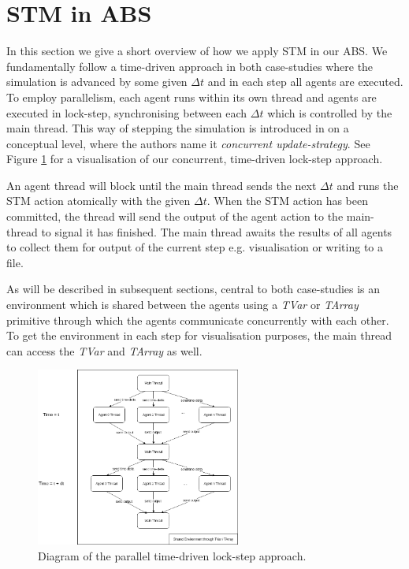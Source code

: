 \section{STM in ABS}
\label{sec:stm_abs}
In this section we give a short overview of how we apply STM in our ABS. We fundamentally follow a time-driven approach in both case-studies where the simulation is advanced by some given $\Delta t$ and in each step all agents are executed. To employ parallelism, each agent runs within its own thread and agents are executed in lock-step, synchronising between each $\Delta t$ which is controlled by the main thread. This way of stepping the simulation is introduced in \cite{thaler_art_2017} on a conceptual level, where the authors name it \textit{concurrent update-strategy}. See Figure \ref{fig:stm_abs_structure} for a visualisation of our concurrent, time-driven lock-step approach. 

An agent thread will block until the main thread sends the next $\Delta t$ and runs the STM action atomically with the given $\Delta t$. When the STM action has been committed, the thread will send the output of the agent action to the main-thread to signal it has finished. The main thread awaits the results of all agents to collect them for output of the current step e.g. visualisation or writing to a file.

As will be described in subsequent sections, central to both case-studies is an environment which is shared between the agents using a \textit{TVar} or \textit{TArray} primitive through which the agents communicate concurrently with each other. To get the environment in each step for visualisation purposes, the main thread can access the \textit{TVar} and \textit{TArray} as well. 

\begin{figure}
	\centering
	\includegraphics[width=0.6\textwidth, angle=0]{./fig/dia/stm_abs.png}
	\caption{Diagram of the parallel time-driven lock-step approach.}
	\label{fig:stm_abs_structure}
\end{figure}